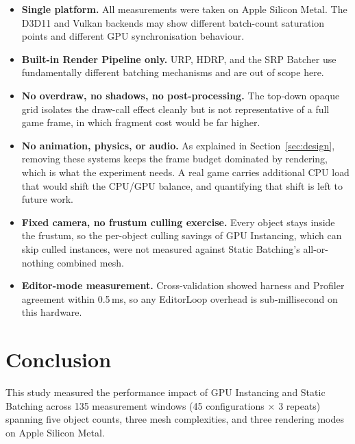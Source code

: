 \documentclass[11pt,a4paper]{article}
\begin{document}
\begin{itemize}
  \item \textbf{Single platform.} All measurements were taken on Apple Silicon Metal.
        The D3D11 and Vulkan backends may show different batch-count saturation points
        and different GPU synchronisation behaviour.
  \item \textbf{Built-in Render Pipeline only.} URP, HDRP, and the SRP Batcher use
        fundamentally different batching mechanisms and are out of scope here.
  \item \textbf{No overdraw, no shadows, no post-processing.} The top-down opaque grid
        isolates the draw-call effect cleanly but is not representative of a full game
        frame, in which fragment cost would be far higher.
  \item \textbf{No animation, physics, or audio.} As explained in
        Section~\ref{sec:design}, removing these systems keeps the frame budget
        dominated by rendering, which is what the experiment needs. A real game carries
        additional CPU load that would shift the CPU/GPU balance, and quantifying that
        shift is left to future work.
  \item \textbf{Fixed camera, no frustum culling exercise.} Every object stays inside
        the frustum, so the per-object culling savings of GPU Instancing, which can
        skip culled instances, were not measured against Static Batching's
        all-or-nothing combined mesh.
  \item \textbf{Editor-mode measurement.} Cross-validation showed harness and Profiler
        agreement within 0.5\,ms, so any EditorLoop overhead is sub-millisecond on this
        hardware.
\end{itemize}

\section{Conclusion}
\label{sec:conclusion}

This study measured the performance impact of GPU Instancing and Static Batching across
135 measurement windows (45 configurations $\times$ 3 repeats) spanning five object
counts, three mesh complexities, and three rendering modes on Apple Silicon Metal.
\end{document}
